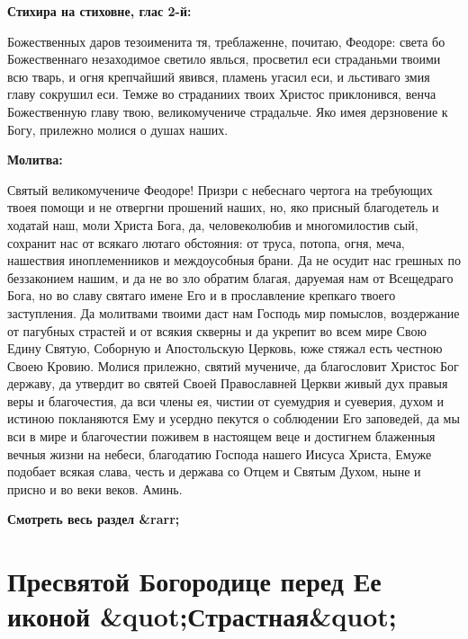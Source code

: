 \medskip


\bfseries Стихира на стиховне, глас 2-й:\normalfont{}


Божественных даров тезоименита тя, треблаженне, почитаю, Феодоре: света бо Божественнаго незаходимое светило явлься, просветил еси страданьми твоими всю тварь, и огня крепчайший явився, пламень угасил еси, и льстиваго змия главу сокрушил еси. Темже во страданиих твоих Христос приклонився, венча Божественную главу твою, великомучениче страдальче. Яко имея дерзновение к Богу, прилежно молися о душах наших.


\medskip


\bfseries Молитва:\normalfont{}


Святый великомучениче Феодоре! Призри с небеснаго чертога на требующих твоея помощи и не отвергни прошений наших, но, яко присный благодетель и ходатай наш, моли Христа Бога, да, человеколюбив и многомилостив сый, сохранит нас от всякаго лютаго обстояния: от труса, потопа, огня, меча, нашествия иноплеменников и междоусобныя брани. Да не осудит нас грешных по беззаконием нашим, и да не во зло обратим благая, даруемая нам от Всещедраго Бога, но во славу святаго имене Его и в прославление крепкаго твоего заступления. Да молитвами твоими даст нам Господь мир помыслов, воздержание от пагубных страстей и от всякия скверны и да укрепит во всем мире Свою Едину Святую, Соборную и Апостольскую Церковь, юже стяжал есть честною Своею Кровию. Молися прилежно, святий мучениче, да благословит Христос Бог державу, да утвердит во святей Своей Православней Церкви живый дух правыя веры и благочестия, да вси члены ея, чистии от суемудрия и суеверия, духом и истиною покланяются Ему и усердно пекутся о соблюдении Его заповедей, да мы вси в мире и благочестии поживем в настоящем веце и достигнем блаженныя вечныя жизни на небеси, благодатию Господа нашего Иисуса Христа, Емуже подобает всякая слава, честь и держава со Отцем и Святым Духом, ныне и присно и во веки веков. Аминь.


\mychapterending


\bfseries Смотреть весь раздел &rarr;\normalfont{} 

\section{Пресвятой Богородице перед Ее иконой &quot;Страстная&quot;}
 
